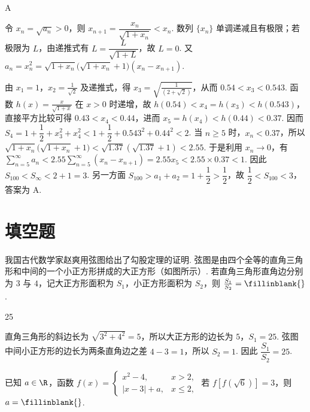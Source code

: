 \begin{answer}
A
\end{answer}

\begin{solution}
令 \(x_n=\sqrt{a_n}>0\)，则
\(x_{n+1}=\dfrac{x_n}{\sqrt{1+x_n}}<x_n\). 数列 \(\{x_n\}\) 单调递减且有极限；若极限为 \(L\)，由递推式有 \(L=\dfrac{L}{\sqrt{1+L}}\)，故 \(L=0\). 又
\(a_n=x_n^{2}=\sqrt{1+x_n}\bigl(\sqrt{1+x_n}+1\bigr)(x_n-x_{n+1})\).

由 \(x_1=1\)，\(x_2=\frac{1}{\sqrt2}\) 及递推式，得
\(x_3=\sqrt{\frac{1}{(2+\sqrt2)}}\)，从而 \(0.54<x_3<0.543\). 函数 \(h(x)=\frac{x}{\sqrt{1+x}}\) 在 \(x>0\) 时递增，故
\(h(0.54)<x_4=h(x_3)<h(0.543)\)，直接平方比较可得 \(0.43<x_4<0.44\)，进而 \(x_5=h(x_4)<h(0.44)<0.37\). 因而
\(S_4=1+\dfrac12+x_3^{2}+x_4^{2}<1+\dfrac12+0.543^{2}+0.44^{2}<2\). 当 \(n\geq5\) 时，\(x_n<0.37\)，所以
\(\sqrt{1+x_n}\bigl(\sqrt{1+x_n}+1\bigr)<\sqrt{1.37}(\sqrt{1.37}+1)<2.55\). 于是利用 \(x_n\to0\)，有
\(\displaystyle\sum_{n=5}^{\infty}a_n<2.55\sum_{n=5}^{\infty}(x_n-x_{n+1})=2.55x_5<2.55\times0.37<1\). 因此 \(S_{100}<S_{\infty}<2+1=3\). 另一方面 \(S_{100}>a_1+a_2=1+\dfrac12>\dfrac12\)，故 \(\dfrac12<S_{100}<3\)，答案为 A.
\end{solution}

\section{填空题}

\begin{problem}
我国古代数学家赵爽用弦图给出了勾股定理的证明. 弦图是由四个全等的直角三角形和中间的一个小正方形拼成的大正方形（如图所示）.
若直角三角形直角边分别为 \(3\) 与 \(4\)，记大正方形面积为 \(S_1\)，小正方形面积为 \(S_2\)，则 \(\frac{S_1}{S_2}=\fillinblank{}\).

\end{problem}

\begin{answer}
25
\end{answer}

\begin{solution}
直角三角形的斜边长为 \(\sqrt{3^{2}+4^{2}}=5\)，所以大正方形的边长为 \(5\)，\(S_{1}=25\). 弦图中间小正方形的边长为两条直角边之差 \(4-3=1\)，所以 \(S_{2}=1\). 因此 \(\dfrac{S_{1}}{S_{2}}=25\).
\end{solution}

\begin{problem}
已知 \(a\in\R\)，函数 \(f(x)=\begin{cases}
x^{2}-4,&x>2,\\
|x-3|+a,&x\le 2,
\end{cases}\) 若 \(f\left[f(\sqrt{6})\right]=3\)，则 \(a=\fillinblank{}\).
\end{problem}

